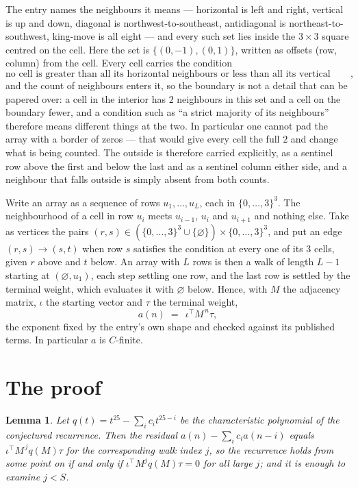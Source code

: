 \documentclass[11pt,a4paper]{article}
\theoremstyle{plain}
\newtheorem{lemma}[theorem]{Lemma}
\theoremstyle{definition}
\begin{document}
The entry names the neighbours it means --- horizontal is left and right, vertical is up and
down, diagonal is northwest-to-southeast, antidiagonal is northeast-to-southwest, king-move is
all eight --- and every such set lies inside the $3\times3$ square centred on the cell. Here
the set is $\{(0,-1), (0,1)\}$, written as offsets (row, column) from the cell. Every cell carries
the condition
\[
\text{no cell is greater than all its horizontal neighbours or less than all its vertical neighbours},
\]
and the count of neighbours enters it, so the boundary is not a detail that can be papered
over: a cell in the interior has $2$ neighbours in this set and a cell on the boundary
fewer, and a condition such as ``a strict majority of its neighbours'' therefore means
different things at the two. In particular one cannot pad the array with a border of zeros ---
that would give every cell the full $2$ and change what is being counted. The outside is
therefore carried
explicitly, as a sentinel row above the first and below the last and as a sentinel column
either side, and a neighbour that falls outside is simply absent from both counts.

Write an array as a sequence of rows $u_1,\dots,u_L$, each in
$\{0,\dots,3\}^{3}$. The neighbourhood of a cell in row $u_i$ meets $u_{i-1}$,
$u_i$ and $u_{i+1}$ and nothing else. Take as vertices the pairs
$(r,s)\in(\{0,\dots,3\}^{3}\cup\{\varnothing\})\times\{0,\dots,3\}^{3}$,
and put an edge $(r,s)\to(s,t)$ when row $s$ satisfies the condition at every one of its
$3$ cells, given $r$ above and $t$ below. An array with $L$ rows is then a walk of length
$L-1$ starting at $(\varnothing,u_1)$, each step settling one row, and the last row is
settled by the terminal weight, which evaluates it with $\varnothing$ below. Hence,
with $M$ the adjacency matrix, $\iota$ the starting vector and $\tau$ the terminal weight,
\[
a(n)\;=\;\,\iota^{\!\top}M^{\,n}\tau ,
\]
the exponent fixed by the entry's own shape and checked against its published terms. In
particular $a$ is $C$-finite.

\section{The proof}

\begin{lemma}\label{lem:crit}
Let $q(t)=t^{25}-\sum_i c_it^{25-i}$ be the characteristic polynomial of the
conjectured recurrence. Then the residual $a(n)-\sum_ic_ia(n-i)$ equals
$\iota^{\!\top}M^{\,j}q(M)\tau$ for the corresponding walk index $j$, so the
recurrence holds from some point on if and only if $\iota^{\!\top}M^{j}q(M)\tau=0$ for all
large $j$; and it is enough to examine $j<S$.
\end{lemma}
\end{document}
